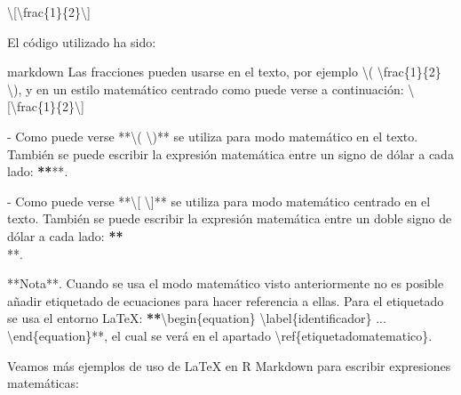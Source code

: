 \documentclass[11pt,a4paper,oneside,]{article}
\newenvironment{Shaded}{\begin{snugshade}}{\end{snugshade}}
\newcommand{\AttributeTok}[1]{\textcolor[rgb]{0.77,0.63,0.00}{#1}}
\newcommand{\DecValTok}[1]{\textcolor[rgb]{0.00,0.00,0.81}{#1}}
\newcommand{\ErrorTok}[1]{\textcolor[rgb]{0.64,0.00,0.00}{\textbf{#1}}}
\newcommand{\NormalTok}[1]{#1}
\newcommand{\SpecialCharTok}[1]{\textcolor[rgb]{0.00,0.00,0.00}{#1}}
\newcommand{\StringTok}[1]{\textcolor[rgb]{0.31,0.60,0.02}{#1}}
\numberwithin{dummy}{section}
\theoremstyle{ocrenumbox}
\theoremstyle{blacknumex}
\theoremstyle{blacknumbox}
\theoremstyle{ocrenum}
\theoremstyle{ocrenum}
\begin{document}
\begin{Shaded}
\begin{Highlighting}[numbers=left,,firstnumber=701,]
\NormalTok{\textbackslash{}[\textbackslash{}frac\{}\DecValTok{1}\NormalTok{\}\{}\DecValTok{2}\NormalTok{\}\textbackslash{}]}

\NormalTok{El código utilizado ha sido}\SpecialCharTok{:}

\StringTok{\textasciigrave{}\textasciigrave{}\textasciigrave{}}\AttributeTok{markdown}
\AttributeTok{Las fracciones pueden usarse en el texto, por ejemplo \textbackslash{}( }\SpecialCharTok{\textbackslash{}f}\AttributeTok{rac\{1\}\{2\} \textbackslash{}), }
\AttributeTok{y en un estilo matemático centrado como puede verse a continuación:}
\AttributeTok{ }
\AttributeTok{\textbackslash{}[}\SpecialCharTok{\textbackslash{}f}\AttributeTok{rac\{1\}\{2\}\textbackslash{}]}

\StringTok{\textasciigrave{}\textasciigrave{}\textasciigrave{}}

\SpecialCharTok{{-}}\NormalTok{ Como puede verse }\SpecialCharTok{**}\StringTok{\textasciigrave{}}\AttributeTok{\textbackslash{}( \textbackslash{})}\StringTok{\textasciigrave{}}\SpecialCharTok{**}\NormalTok{ se utiliza para modo matemático en el texto. También se puede escribir la expresión matemática entre un signo de dólar a cada lado}\SpecialCharTok{:} \ErrorTok{**}\StringTok{\textasciigrave{}}\AttributeTok{$  $}\StringTok{\textasciigrave{}}\SpecialCharTok{**}\NormalTok{.}

\SpecialCharTok{{-}}\NormalTok{ Como puede verse }\SpecialCharTok{**}\StringTok{\textasciigrave{}}\AttributeTok{\textbackslash{}[ \textbackslash{}]}\StringTok{\textasciigrave{}}\SpecialCharTok{**}\NormalTok{ se utiliza para modo matemático centrado en el texto. También se puede escribir la expresión matemática entre un doble signo de dólar a cada lado}\SpecialCharTok{:} \ErrorTok{**}\StringTok{\textasciigrave{}}\AttributeTok{$$  $$}\StringTok{\textasciigrave{}}\SpecialCharTok{**}\NormalTok{.}


\SpecialCharTok{**}\NormalTok{Nota}\SpecialCharTok{**}\NormalTok{. Cuando se usa el modo matemático visto anteriormente no es posible añadir etiquetado de ecuaciones para hacer referencia a ellas. Para el etiquetado se usa el entorno LaTeX}\SpecialCharTok{:} \ErrorTok{**}\StringTok{\textasciigrave{}}\SpecialCharTok{\textbackslash{}b}\AttributeTok{egin\{equation\} \textbackslash{}label\{identificador\} ... }\SpecialCharTok{\textbackslash{}e}\AttributeTok{nd\{equation\}}\StringTok{\textasciigrave{}}\SpecialCharTok{**}\NormalTok{, el cual se verá en el apartado \textbackslash{}ref\{etiquetadomatematico\}.}

\NormalTok{Veamos más ejemplos de uso de LaTeX en R Markdown para escribir expresiones matemáticas}\SpecialCharTok{:}


\end{Highlighting}
\end{Shaded}
\end{document}
